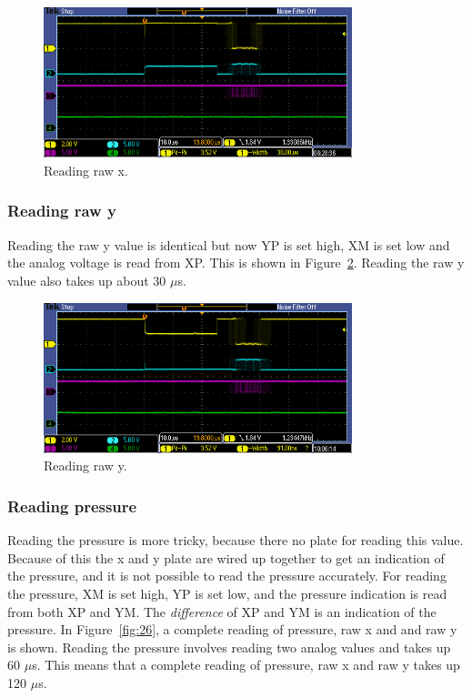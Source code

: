 \documentclass[12pt]{article}
\begin{document}
\begin{figure}[!ht]
\centering
\includegraphics[width=0.8\textwidth]{sample_x}
\caption{Reading raw x.}
\label{fig:21}
\end{figure}

\subsubsection{Reading raw y}
Reading the raw y value is identical but now YP is set high, XM is set low and the analog voltage is read from XP. This is shown in Figure~\ref{fig:22}. Reading the raw y value also takes up about 30 $\mu$s.

\begin{figure}[!ht]
\centering
\includegraphics[width=0.8\textwidth]{sample_y}
\caption{Reading raw y.}
\label{fig:22}
\end{figure}


\subsubsection{Reading pressure}
Reading the pressure is more tricky, because there no plate for reading this value. Because of this the x and y plate are wired up together to get an indication of the pressure, and it is not possible to read the pressure accurately. For reading the pressure, XM is set high, YP is set low, and the pressure indication is read from both XP and YM. The \textsl{difference} of XP and YM is an indication of the pressure. In Figure~\ref{fig:26}, a complete reading of pressure, raw x and and raw y is shown. Reading the pressure involves reading two analog values and takes up 60 $\mu$s. This means that a complete reading of pressure, raw x and raw y takes up 120 $\mu$s.
\end{document}
